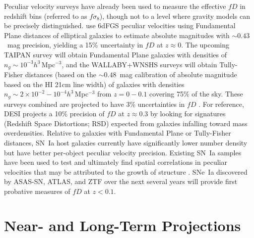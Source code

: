 \documentclass[11pt, oneside]{article}   	%
\begin{document}
Peculiar velocity surveys have already been  used to measure
the effective $fD$ in redshift bins  (referred to as $f\sigma_8$), though not to a level where  gravity models can be precisely distinguished.
 \cite{2017MNRAS.471..839A} use 6dFGS peculiar velocities using  Fundamental Plane distances of elliptical galaxies to estimate absolute magnitudes
 with
 $\sim 0.43$~mag  precision, yielding a 15\% uncertainty in $fD$ at $z\approx 0$.
The upcoming 
TAIPAN survey \cite{2017PASA...34...47D} will obtain Fundamental Plane galaxies with densities of $n_g \sim 10^{-3}h^3$\,Mpc$^{-3}$,
and the WALLABY+WNSHS surveys \cite{2008ExA....22..151J} will obtain Tully-Fisher distances (based on the $\sim 0.48$~mag calibration of absolute magnitude based on the  HI 21cm line width)
of galaxies with densities $n_g \sim 2\times 10^{-2} - 10^{-4} h^3$\,Mpc$^{-3}$ from
$z=0-0.1$ covering 75\% of the sky.
These surveys combined are projected to have 3\% uncertainties in $fD$ \cite{2017MNRAS.464.2517H}.
For reference, DESI projects a 10\% precision of $fD$ at $z \approx 0.3$  by looking 
for signatures (Redshift Space Distortions; RSD) expected from galaxies infalling toward mass overdensities.
Relative to galaxies with  Fundamental Plane or Tully-Fisher distances, 
SN~Ia host galaxies currently have significantly lower number density but have better per-object peculiar velocity precision.
Existing SN~Ia samples
have been used to test and ultimately find spatial correlations in peculiar velocities that may be attributed to the growth of structure
\cite{PhysRevLett.99.081301,2008MNRAS.389L..47A,2014MNRAS.444.3926J,2015JCAP...12..033H, 2017JCAP...05..015H}.
SNe~Ia discovered by ASAS-SN, ATLAS, and ZTF \cite{2014ApJ...788...48S,2018PASP..130f4505T,2019PASP..131a8002B} over the next several years will provide first probative measures of $fD$ at $z<0.1$.

\section{Near- and Long-Term Projections}
\end{document}
